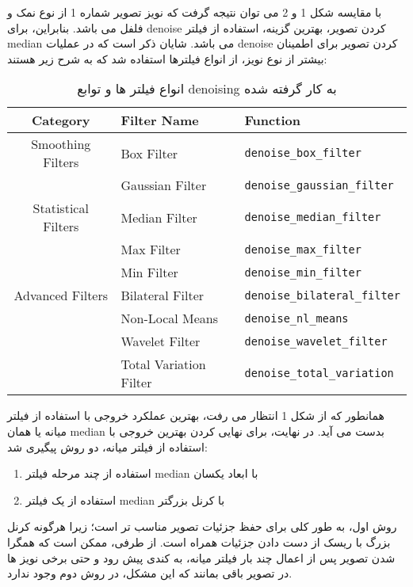 \documentclass[a4paper,12pt]{article}
\begin{document}
با مقایسه شکل 1 و 2 می توان نتیجه گرفت که نویز تصویر شماره 1 از نوع نمک و فلفل می باشد. بنابراین، برای denoise کردن تصویر، بهترین گزینه، استفاده از فیلتر median می باشد. 
شایان ذکر است که در عملیات denoise کردن تصویر برای اطمینان بیشتر از نوع نویز، از انواع فیلترها استفاده شد که به شرح زیر هستند:

\begin{table}[ht]
	\centering
	\begin{latin}
	\begin{tabular}{|c|l|l|}
		\hline
		\textbf{Category} & \textbf{Filter Name} & \textbf{Function} \\
		\hline
		Smoothing Filters  & Box Filter              & \texttt{denoise\_box\_filter} \\
		& Gaussian Filter         & \texttt{denoise\_gaussian\_filter} \\
		\hline
		Statistical Filters & Median Filter           & \texttt{denoise\_median\_filter} \\
		& Max Filter              & \texttt{denoise\_max\_filter} \\
		& Min Filter              & \texttt{denoise\_min\_filter} \\
		\hline
		Advanced Filters   & Bilateral Filter        & \texttt{denoise\_bilateral\_filter} \\
		& Non-Local Means         & \texttt{denoise\_nl\_means} \\
		& Wavelet Filter          & \texttt{denoise\_wavelet\_filter} \\
		& Total Variation Filter  & \texttt{denoise\_total\_variation} \\
		\hline
	\end{tabular}
	\end{latin}
	\caption{انواع فیلتر ها و توابع denoising به کار گرفته شده}
\end{table}


همانطور که از شکل 1 انتظار می رفت، بهترین عملکرد خروجی با استفاده از فیلتر میانه یا همان median بدست می آید. در نهایت، برای نهایی کردن بهترین خروجی با استفاده از فیلتر میانه، دو روش پیگیری شد:
\begin{enumerate}
	\item 
	استفاده از چند مرحله فیلتر median با ابعاد یکسان
	\item 
	استفاده از یک فیلتر median با کرنل بزرگتر
\end{enumerate}
روش اول، به طور کلی برای حفظ جزئیات تصویر مناسب تر است؛ زیرا هرگونه کرنل بزرگ  با ریسک از دست دادن جزئیات همراه است. از طرفی، ممکن است که همگرا شدن تصویر پس از اعمال چند بار فیلتر میانه، به کندی پیش رود و حتی برخی نویز ها در تصویر باقی بمانند که این مشکل، در روش دوم وجود ندارد. 
\end{document}
